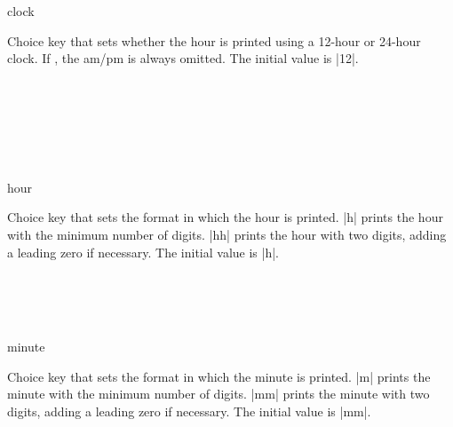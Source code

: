 \documentclass{beerydoc}
\begin{document}
\begin{codedoc}{clock}
  \begin{syntax}
  \end{syntax}
  Choice key that sets whether the hour is printed using a 12-hour or 24-hour
  clock.
  If , the am/pm is always omitted.
  The initial value is |12|.
  \begin{codedemo}
    \\
    \\
    \\
    \\
    \\
  \end{codedemo}
\end{codedoc}

\begin{codedoc}{hour}
  \begin{syntax}
  \end{syntax}
  Choice key that sets the format in which the hour is printed.
  |h| prints the hour with the minimum number of digits.
  |hh| prints the hour with two digits, adding a leading zero if necessary.
  The initial value is |h|.
  \begin{codedemo}
    \\
    \\
    \\
  \end{codedemo}
\end{codedoc}

\begin{codedoc}{minute}
  \begin{syntax}
  \end{syntax}
  Choice key that sets the format in which the minute is printed.
  |m| prints the minute with the minimum number of digits.
  |mm| prints the minute with two digits, adding a leading zero if necessary.
  The initial value is |mm|.
  \begin{codedemo}
    \\
    \\
    \\
  \end{codedemo}
\end{codedoc}
\end{document}

